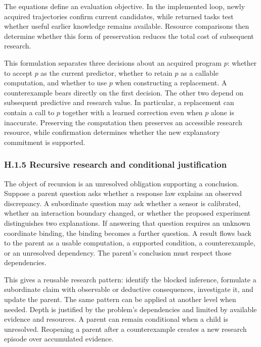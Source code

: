 \documentclass[11pt,a4paper]{article}
\begin{document}
The equations define an evaluation objective. In the implemented loop, newly acquired trajectories confirm current candidates, while returned tasks test whether useful earlier knowledge remains available. Resource comparisons then determine whether this form of preservation reduces the total cost of subsequent research.


This formulation separates three decisions about an acquired program \(p\): whether to accept \(p\) as the current predictor, whether to retain \(p\) as a callable computation, and whether to use \(p\) when constructing a replacement. A counterexample bears directly on the first decision. The other two depend on subsequent predictive and research value. In particular, a replacement can contain a call to \(p\) together with a learned correction even when \(p\) alone is inaccurate. Preserving the computation then preserves an accessible research resource, while confirmation determines whether the new explanatory commitment is supported.


\subsubsection*{H.1.5 Recursive research and conditional justification}

The object of recursion is an unresolved obligation supporting a conclusion. Suppose a parent question asks whether a response law explains an observed discrepancy. A subordinate question may ask whether a sensor is calibrated, whether an interaction boundary changed, or whether the proposed experiment distinguishes two explanations. If answering that question requires an unknown coordinate binding, the binding becomes a further question. A result flows back to the parent as a usable computation, a supported condition, a counterexample, or an unresolved dependency. The parent's conclusion must respect those dependencies.


This gives a reusable research pattern: identify the blocked inference, formulate a subordinate claim with observable or deductive consequences, investigate it, and update the parent. The same pattern can be applied at another level when needed. Depth is justified by the problem's dependencies and limited by available evidence and resources. A parent can remain conditional when a child is unresolved. Reopening a parent after a counterexample creates a new research episode over accumulated evidence.
\end{document}
